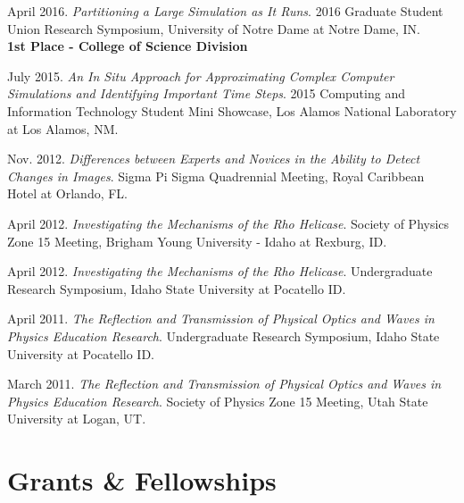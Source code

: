 \documentclass[11pt, letterpaper, roman]{moderncv} %
\begin{document}
\begin{etaremune}[topsep=0pt, itemsep=5pt, partopsep=0pt, parsep=0pt]
  \item April 2016. \textit{Partitioning a Large Simulation as It Runs}. 2016 Graduate Student Union Research Symposium, University of Notre Dame at Notre Dame, IN.\\
  \textbf{1st Place - College of Science Division}

  \item July 2015. \textit{An In Situ Approach for Approximating Complex Computer Simulations and Identifying Important Time Steps}. 2015 Computing and Information Technology Student Mini Showcase, Los Alamos National Laboratory at Los Alamos, NM.

  \item Nov. 2012. \textit{Differences between Experts and Novices in the Ability to Detect Changes in Images}. Sigma Pi Sigma Quadrennial Meeting, Royal Caribbean Hotel at Orlando, FL.

  \item April 2012. \textit{Investigating the Mechanisms of the Rho Helicase}. Society of Physics Zone 15 Meeting, Brigham Young University - Idaho at Rexburg, ID.

  \item April 2012. \textit{Investigating the Mechanisms of the Rho Helicase}. Undergraduate Research Symposium, Idaho State University at Pocatello ID.

  \item April 2011. \textit{The Reflection and Transmission of Physical Optics and Waves in Physics Education Research}. Undergraduate Research Symposium, Idaho State University at Pocatello ID.

  \item March 2011. \textit{The Reflection and Transmission of Physical Optics and Waves in Physics Education Research}. Society of Physics Zone 15 Meeting, Utah State University at Logan, UT.
\end{etaremune}



\section{Grants \& Fellowships}
    \vspace{2pt}
    
\end{document}
